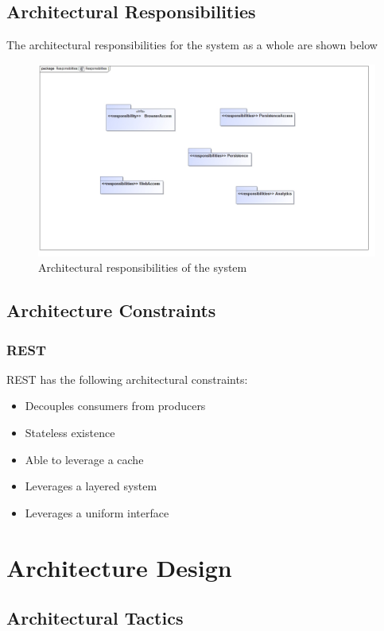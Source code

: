 \documentclass{article}
\begin{document}
\subsection{Architectural Responsibilities}
The architectural responsibilities for the system as a whole are shown below
\begin{figure}[H]
	\centering
	\includegraphics[width=\textwidth]{Responsibilities.jpg}
	\caption{Architectural responsibilities of the system}
\end{figure}
\subsection{Architecture Constraints}
\subsubsection{REST}
	REST has the following architectural constraints:
	\begin{itemize}
		\item Decouples consumers from producers
		\item Stateless existence
		\item Able to leverage a cache
		\item Leverages a layered system
		\item Leverages a uniform interface
	\end{itemize}

\cleardoublepage

\section{Architecture Design}
\subsection{Architectural Tactics}
\end{document}

